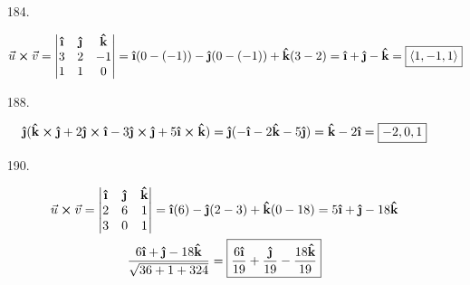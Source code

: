 ﻿\documentclass[10pt, letterpaper]{article}
\begin{document}
    \begin{enumerate}
        \item[184.]\mbox{}
        \begin{mdframed}
            \begin{equation*}
                \begin{gathered}
                    \vec{u} \cross \vec{v} =
                    \begin{vmatrix}
                        \ihat & \jhat & \khat   \\
                        3 & 2 & -1              \\
                        1 & 1 & 0               \\
                    \end{vmatrix}
                    = \ihat(0-(-1)) - \jhat(0-(-1)) + \khat(3-2) 
                    = \ihat + \jhat - \khat
                    = \boxed{\expval{1, -1, 1}}
                \end{gathered}
            \end{equation*}
        \end{mdframed}

        \item[188.]\mbox{}
        \begin{mdframed}
            \begin{equation*}
                \begin{gathered}
                    \jhat(\khat \cross \jhat + 2\jhat \cross \ihat 
                          - 3 \jhat \cross \jhat + 5\ihat \cross \khat)
                          = \jhat(-\ihat - 2\khat - 5\jhat)
                          = \khat - 2\ihat = \boxed{-2, 0, 1}
                \end{gathered}
            \end{equation*}
        \end{mdframed}

        \item[190.]\mbox{}
        \begin{mdframed}
            \begin{equation*}
                \begin{gathered}
                    \vec{u} \cross \vec{v} =
                    \begin{vmatrix}
                        \ihat & \jhat & \khat   \\
                        2 & 6 & 1               \\
                        3 & 0 & 1               \\
                    \end{vmatrix}
                    = \ihat(6) - \jhat(2 - 3) + \khat(0 - 18)
                    = 5\ihat + \jhat -18\khat   \\
                    \frac{6\ihat + \jhat -18\khat}
                         {\sqrt{36 + 1 + 324}}
                    = \boxed{\frac{6\ihat}{19} + \frac{\jhat}{19} - \frac{18\khat}{19}}
                \end{gathered}
            \end{equation*}
        \end{mdframed}


\end{enumerate}
\end{document}
